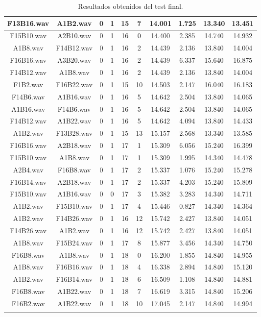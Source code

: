 \documentclass[11pt,a4paper,twoside]{book}
\begin{document}
\begin{longtable}[c]{|c|c|c|c|c|c|c|c|c|c|}
F13B16.wav&A1B2.wav&0&1&15&7&14.001&1.725&13.340&13.451\\ \hline
F15B10.wav&A2B10.wav&0&1&16&0&14.400&2.385&14.740&14.932\\ \hline
A1B8.wav&F14B12.wav&0&1&16&2&14.439&2.136&13.840&14.004\\ \hline
F16B16.wav&A3B20.wav&0&1&16&2&14.439&6.337&15.640&16.875\\ \hline
F14B12.wav&A1B8.wav&0&1&16&2&14.439&2.136&13.840&14.004\\ \hline
F1B2.wav&F16B22.wav&0&1&15&10&14.503&2.147&16.040&16.183\\ \hline
F14B6.wav&A1B16.wav&0&1&16&5&14.642&2.504&13.840&14.065\\ \hline
A1B16.wav&F14B6.wav&0&1&16&5&14.642&2.504&13.840&14.065\\ \hline
F14B12.wav&A1B22.wav&0&1&16&5&14.642&4.094&13.840&14.433\\ \hline
A1B2.wav&F13B28.wav&0&1&15&13&15.157&2.568&13.340&13.585\\ \hline
F16B16.wav&A2B18.wav&0&1&17&1&15.309&6.056&15.240&16.399\\ \hline
F15B10.wav&A1B8.wav&0&1&17&1&15.309&1.995&14.340&14.478\\ \hline
A2B4.wav&F16B8.wav&0&1&17&2&15.337&1.076&15.240&15.278\\ \hline
F16B14.wav&A2B18.wav&0&1&17&2&15.337&4.203&15.240&15.809\\ \hline
F15B10.wav&A1B16.wav&0&0&17&3&15.382&3.283&14.340&14.711\\ \hline
A1B2.wav&F15B10.wav&0&1&17&4&15.446&0.827&14.340&14.364\\ \hline
A1B2.wav&F14B26.wav&0&1&16&12&15.742&2.427&13.840&14.051\\ \hline
F14B26.wav&A1B2.wav&0&1&16&12&15.742&2.427&13.840&14.051\\ \hline
A1B8.wav&F15B24.wav&0&1&17&8&15.877&3.456&14.340&14.750\\ \hline
F16B8.wav&A1B8.wav&0&1&18&0&16.200&1.855&14.840&14.955\\ \hline
A1B8.wav&F16B16.wav&0&1&18&4&16.338&2.894&14.840&15.120\\ \hline
A1B2.wav&F16B14.wav&0&1&18&6&16.509&1.108&14.840&14.881\\ \hline
F16B8.wav&A1B22.wav&0&1&18&7&16.619&3.315&14.840&15.206\\ \hline
F16B2.wav&A1B22.wav&0&1&18&10&17.045&2.147&14.840&14.994\\ \hline
\caption{Resultados obtenidos del test final.}
\end{longtable}
\end{document}
